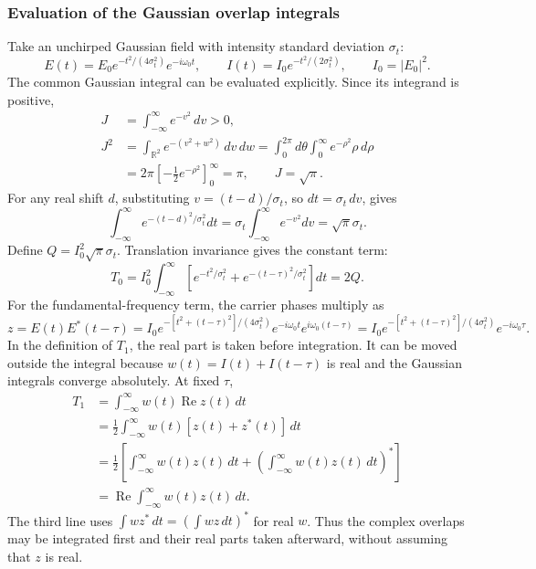 \subsubsection{Evaluation of the Gaussian overlap integrals}
Take an unchirped Gaussian field with intensity standard deviation $\sigma_t$:
\begin{equation}
E(t)=E_0e^{-t^2/(4\sigma_t^2)}e^{-i\omega_0t},
\qquad I(t)=I_0e^{-t^2/(2\sigma_t^2)},\qquad I_0=|E_0|^2.
\end{equation}
The common Gaussian integral can be evaluated explicitly. Since its integrand is positive,
\begin{align}
J&=\int_{-\infty}^{\infty}e^{-v^2}\,dv>0,\\
J^2&=\int_{\mathbb R^2}e^{-(v^2+w^2)}\,dv\,dw
=\int_0^{2\pi}d\theta\int_0^\infty e^{-\rho^2}\rho\,d\rho\\
&=2\pi\left[-\tfrac12e^{-\rho^2}\right]_0^\infty=\pi,
\qquad J=\sqrt{\pi}.
\end{align}
For any real shift $d$, substituting $v=(t-d)/\sigma_t$, so $dt=\sigma_t\,dv$, gives
\begin{equation}
\int_{-\infty}^{\infty}e^{-(t-d)^2/\sigma_t^2}dt
=\sigma_t\int_{-\infty}^{\infty}e^{-v^2}dv
=\sqrt{\pi}\sigma_t.
\end{equation}
Define $Q=I_0^2\sqrt{\pi}\sigma_t$. Translation invariance gives the constant term:
\begin{equation}
T_0=I_0^2\int_{-\infty}^{\infty}
\left[e^{-t^2/\sigma_t^2}+e^{-(t-\tau)^2/\sigma_t^2}\right]dt=2Q.
\end{equation}
For the fundamental-frequency term, the carrier phases multiply as
\begin{equation}
z=E(t)E^*(t-\tau)
=I_0e^{-[t^2+(t-\tau)^2]/(4\sigma_t^2)}
e^{-i\omega_0t}e^{i\omega_0(t-\tau)}
=I_0e^{-[t^2+(t-\tau)^2]/(4\sigma_t^2)}e^{-i\omega_0\tau}.
\end{equation}
In the definition of $T_1$, the real part is taken before integration. It can be moved outside the integral because $w(t)=I(t)+I(t-\tau)$ is real and the Gaussian integrals converge absolutely. At fixed $\tau$,
\begin{align*}
T_1&=\int_{-\infty}^{\infty}w(t)\operatorname{Re}z(t)\,dt\\
&=\frac12\int_{-\infty}^{\infty}w(t)[z(t)+z^*(t)]\,dt\\
&=\frac12\left[\int_{-\infty}^{\infty}w(t)z(t)\,dt
+\left(\int_{-\infty}^{\infty}w(t)z(t)\,dt\right)^*\right]\\
&=\operatorname{Re}\int_{-\infty}^{\infty}w(t)z(t)\,dt.
\end{align*}
The third line uses $\int w z^*\,dt=(\int w z\,dt)^*$ for real $w$. Thus the complex overlaps may be integrated first and their real parts taken afterward, without assuming that $z$ is real.

